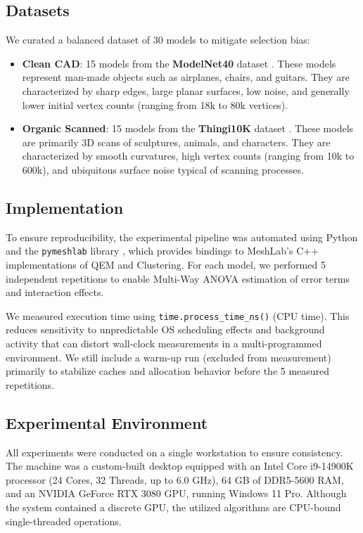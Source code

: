 \subsection{Datasets}
We curated a balanced dataset of 30 models to mitigate selection bias:
\begin{itemize}
    \item \textbf{Clean CAD}: 15 models from the \textbf{ModelNet40} dataset \cite{wu20153d}. These models represent man-made objects such as airplanes, chairs, and guitars. They are characterized by sharp edges, large planar surfaces, low noise, and generally lower initial vertex counts (ranging from 18k to 80k vertices).
    \item \textbf{Organic Scanned}: 15 models from the \textbf{Thingi10K} dataset \cite{zhou2016thingi10k}. These models are primarily 3D scans of sculptures, animals, and characters. They are characterized by smooth curvatures, high vertex counts (ranging from 10k to 600k), and ubiquitous surface noise typical of scanning processes.
\end{itemize}

\subsection{Implementation}
To ensure reproducibility, the experimental pipeline was automated using Python and the \texttt{pymeshlab} library \cite{muntoni2020pymeshlab}, which provides bindings to MeshLab's C++ implementations of QEM and Clustering. For each model, we performed 5 independent repetitions to enable Multi-Way ANOVA estimation of error terms and interaction effects.

We measured execution time using \texttt{time.process\_time\_ns()} (CPU time). This reduces sensitivity to unpredictable OS scheduling effects and background activity that can distort wall-clock measurements in a multi-programmed environment. We still include a warm-up run (excluded from measurement) primarily to stabilize caches and allocation behavior before the 5 measured repetitions.

\subsection{Experimental Environment}
All experiments were conducted on a single workstation to ensure consistency. The machine was a custom-built desktop equipped with an Intel Core i9-14900K processor (24 Cores, 32 Threads, up to 6.0 GHz), 64 GB of DDR5-5600 RAM, and an NVIDIA GeForce RTX 3080 GPU, running Windows 11 Pro. Although the system contained a discrete GPU, the utilized algorithms are CPU-bound single-threaded operations.

